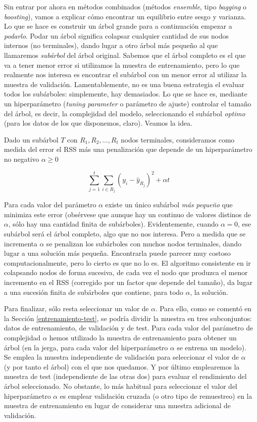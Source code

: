 \documentclass[]{book}
\theoremstyle{break}
\theoremstyle{definition}
\theoremstyle{definition}
\theoremstyle{definition}
\theoremstyle{remark}
\begin{document}
Sin entrar por ahora en métodos combinados (métodos \emph{ensemble},
tipo \emph{bagging} o \emph{boosting}), vamos a explicar cómo encontrar
un equilibrio entre sesgo y varianza. Lo que se hace es construir un
árbol grande para a continuación empezar a \emph{podarlo}. Podar un
árbol significa colapsar cualquier cantidad de sus nodos internos (no
terminales), dando lugar a otro árbol más pequeño al que llamaremos
\emph{subárbol} del árbol original. Sabemos que el árbol completo es el
que va a tener menor error si utilizamos la muestra de entrenamiento,
pero lo que realmente nos interesa es encontrar el subárbol con un menor
error al utilizar la muestra de validación. Lamentablemente, no es una
buena estrategia el evaluar todos los subárboles: simplemente, hay
demasiados. Lo que se hace es, mediante un hiperparámetro (\emph{tuning
parameter} o parámetro de ajuste) controlar el tamaño del árbol, es
decir, la complejidad del modelo, seleccionando el subárbol
\emph{optimo} (para los datos de los que disponemos, claro). Veamos la
idea.

Dado un subárbol \(T\) con \(R_1, R_2, \ldots, R_t\) nodos terminales,
consideramos como medida del error el RSS más una penalización que
depende de un hiperparámetro no negativo \(\alpha \ge 0\)

\[\sum_{j=1}^t \sum_{i\in R_j} (y_i - \widehat y_{R_j})^2 + \alpha t\]

Para cada valor del parámetro \(\alpha\) existe un único subárbol
\emph{más pequeño} que minimiza este error (obsérvese que aunque hay un
continuo de valores distinos de \(\alpha\), sólo hay una cantidad finita
de subárboles). Evidentemente, cuando \(\alpha = 0\), ese subárbol será
el árbol completo, algo que no nos interesa. Pero a medida que se
incrementa \(\alpha\) se penalizan los subárboles con muchos nodos
terminales, dando lugar a una solución más pequeña. Encontrarla puede
parecer muy costoso computacionalmente, pero lo cierto es que no lo es.
El algoritmo consistente en ir colapsando nodos de forma sucesiva, de
cada vez el nodo que produzca el menor incremento en el RSS (corregido
por un factor que depende del tamaño), da lugar a una sucesión finita de
subárboles que contiene, para todo \(\alpha\), la solución.

Para finalizar, sólo resta seleccionar un valor de \(\alpha\). Para
ello, como se comentó en la Sección \ref{entrenamiento-test}, se podría
dividir la muestra en tres subconjuntos: datos de entrenamiento, de
validación y de test. Para cada valor del parámetro de complejidad
\(\alpha\) hemos utilizado la muestra de entrenamiento para obtener un
árbol (en la jerga, para cada valor del hiperparámetro \(\alpha\) se
entrena un modelo). Se emplea la muestra independiente de validación
para seleccionar el valor de \(\alpha\) (y por tanto el árbol) con el
que nos quedamos. Y por último emplearemos la muestra de test
(independiente de las otras dos) para evaluar el rendimiento del árbol
seleccionado. No obstante, lo más habitual para seleccionar el valor del
hiperparámetro \(\alpha\) es emplear validación cruzada (o otro tipo de
remuestreo) en la muestra de entrenamiento en lugar de considerar una
muestra adicional de validación.
\end{document}
